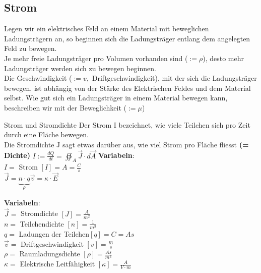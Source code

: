 %
%
%
%
%

					\subsection{Strom}
					\label{chap:Style}
					Legen wir ein elektrisches Feld an einem Material mit beweglichen Ladungsträgern an,
					so beginnen sich die Ladungsträger entlang dem angelegten Feld zu bewegen. \\
					Je mehr freie Ladungsträger pro Volumen vorhanden sind ($:= \rho$), desto mehr Ladungsträger werden sich zu bewegen beginnen. \\
					Die Geschwindigkeit ($:= v,$ Driftgeschwindigkeit), mit der sich die Ladungsträger bewegen, ist abhängig von der Stärke des Elektrischen Feldes und
					dem Material selbst. Wie gut sich ein Ladungsträger in einem Material bewegen kann, beschreiben wir mit der Beweglichkeit ($:= \mu$)


					 {Strom und Stromdichte}
					\beginip
					Der Strom I bezeichnet, wie viele Teilchen sich pro Zeit durch eine Fläche bewegen. \\
					Die Stromdichte J sagt etwas darüber aus, wie viel Strom pro Fläche fliesst \textbf{(= Dichte)}
					\formulaBegin
						$\displaystyle I := \frac{dQ}{dt} = \oiint_A \vec{J} \cdot d\vec{A}$
					\formulaEnd
					\textbf{Variabeln}: \\
					$ I = $ Strom $ [I] = A = \frac{C}{s}$ \\

					\formulaBegin
					$\displaystyle \vec{J} = \underbrace{n\cdot q}_{\rho} \vec{v} = \kappa \cdot \vec{E}$
					\formulaEnd

					\textbf{Variabeln}: \\
					$ \vec{J} = $ Stromdichte $ [J] = \frac{A}{m^2}$ \\
					$ n =$ Teilchendichte $ [n] = \frac{1}{m^3}$ \\
					$ q =$ Ladungen der Teilchen$ [q] = C = As$ \\
					$ \vec{v} = $ Driftgeschwindigkeit $ [v] = \frac{m}{s}$ \\
					$ \rho = $ Raumladungsdichte $ [\rho] = \frac{As}{m^3}$ \\
					$ \kappa = $ Elektrische Leitfähigkeit $ [\kappa] = \frac{A}{V\cdot m}$
					\iend

